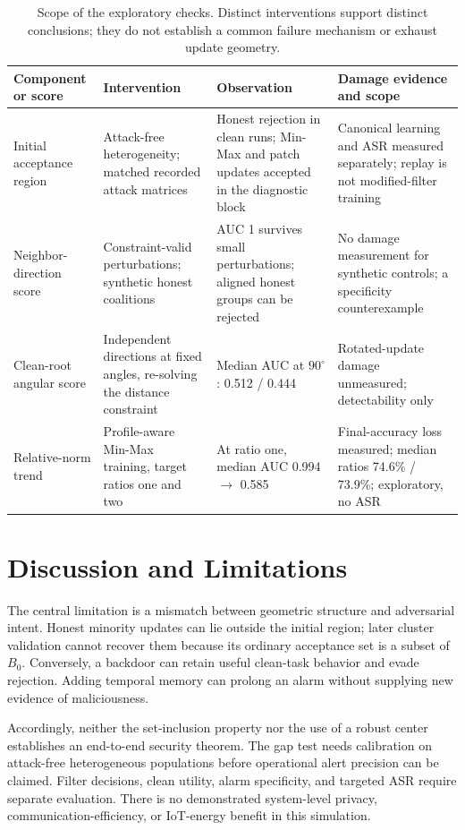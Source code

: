 \documentclass[journal]{IEEEtran}
\begin{document}
\begin{table}[t]
\centering
\caption{Scope of the exploratory checks. Distinct interventions support distinct conclusions; they do not establish a common failure mechanism or exhaust update geometry.}
\label{tab:signal_scope}
\footnotesize
\begin{tabular}{p{}p{}p{}p{}}
\toprule
Component or score & Intervention & Observation & Damage evidence and scope \\
\midrule
Initial acceptance region & Attack-free heterogeneity; matched recorded attack matrices & Honest rejection in clean runs; Min-Max and patch updates accepted in the diagnostic block & Canonical learning and ASR measured separately; replay is not modified-filter training \\
Neighbor-direction score & Constraint-valid perturbations; synthetic honest coalitions & AUC 1 survives small perturbations; aligned honest groups can be rejected & No damage measurement for synthetic controls; a specificity counterexample \\
Clean-root angular score & Independent directions at fixed angles, re-solving the distance constraint & Median AUC at $90^\circ$: 0.512 / 0.444 & Rotated-update damage unmeasured; detectability only \\
Relative-norm trend & Profile-aware Min-Max training, target ratios one and two & At ratio one, median AUC 0.994 $\to$ 0.585 & Final-accuracy loss measured; median ratios 74.6\% / 73.9\%; exploratory, no ASR \\
\bottomrule
\end{tabular}
\end{table}

\section{Discussion and Limitations}
The central limitation is a mismatch between geometric structure and adversarial intent. Honest minority updates can lie outside the initial region; later cluster validation cannot recover them because its ordinary acceptance set is a subset of $B_0$. Conversely, a backdoor can retain useful clean-task behavior and evade rejection. Adding temporal memory can prolong an alarm without supplying new evidence of maliciousness.

Accordingly, neither the set-inclusion property nor the use of a robust center establishes an end-to-end security theorem. The gap test needs calibration on attack-free heterogeneous populations before operational alert precision can be claimed. Filter decisions, clean utility, alarm specificity, and targeted ASR require separate evaluation. There is no demonstrated system-level privacy, communication-efficiency, or IoT-energy benefit in this simulation.
\end{document}
